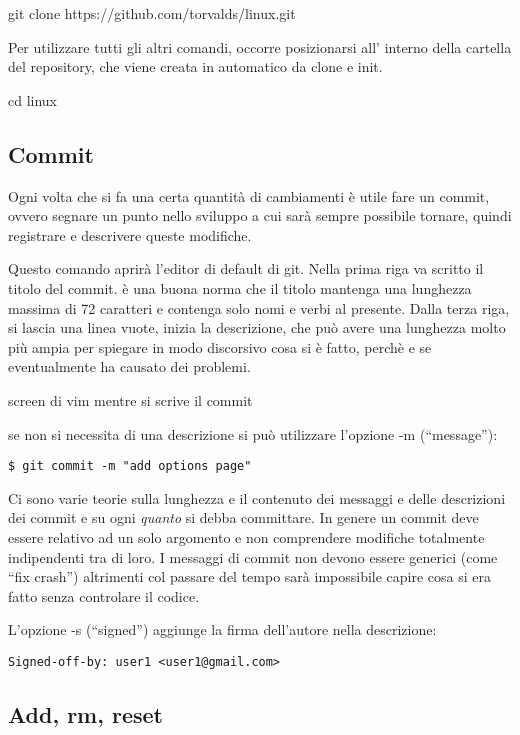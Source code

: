 \documentclass{article} \usepackage[textwidth=18cm,textheight=18cm]{geometry}
\begin{document}
git clone https://github.com/torvalds/linux.git

Per utilizzare tutti gli altri comandi, occorre posizionarsi all' interno della
cartella del repository, che viene creata in automatico da clone e init.

cd linux

\subsection{Commit}

Ogni volta che si fa una certa quantità di cambiamenti è utile fare un commit,
ovvero segnare un punto nello sviluppo a cui sarà sempre possibile tornare,
quindi registrare e descrivere queste modifiche. 


Questo comando aprirà l'editor di default di git. Nella prima riga va scritto il
titolo del commit. è una buona norma che il titolo mantenga una lunghezza
massima di 72 caratteri e contenga solo nomi e verbi al presente. Dalla
terza riga, si lascia una linea vuote, inizia la descrizione, che può avere una 
lunghezza molto più ampia per spiegare in modo discorsivo cosa si è fatto, 
perchè e se eventualmente ha causato dei problemi.

screen di vim mentre si scrive il commit

se non si necessita di una descrizione si può utilizzare l'opzione -m
(``message''):

\begin{verbatim}
$ git commit -m "add options page"
\end{verbatim}

Ci sono varie teorie  sulla lunghezza e il contenuto dei messaggi e delle
descrizioni dei commit e su ogni \emph{quanto} si debba committare. In genere un
commit deve essere relativo ad un solo argomento e non comprendere modifiche
totalmente indipendenti tra di loro. I messaggi di commit non devono essere
generici (come ``fix crash'') altrimenti col passare del tempo sarà impossibile
capire cosa si era fatto senza controlare il codice.

L'opzione -s (``signed'') aggiunge la firma dell'autore nella descrizione:

\begin{verbatim}
Signed-off-by: user1 <user1@gmail.com>
\end{verbatim}

\subsection{Add, rm, reset}
\end{document}
